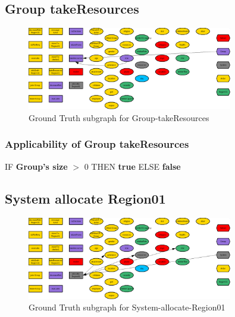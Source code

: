 \documentclass{article}%
\begin{document}
%
\subsection{Group takeResources}%
\label{subsec:Group takeResources}%


\begin{figure}[ht]%
\centering%
\includegraphics[width=0.8\textwidth]{images/Group-takeResources.png}%
\caption{Ground Truth subgraph for Group{-}takeResources}%
\end{figure}

%
\subsubsection{Applicability of Group takeResources}%
\label{ssubsec:Applicability of Group takeResources}%
\begin{flushleft}%
IF %
\textbf{Group's size}%
$>$%
0%
\linebreak%
\hspace*{2em}%
THEN %
\textbf{true}%
\linebreak%
\hspace*{2em}%
ELSE %
\textbf{false}%
\end{flushleft}

%
\subsection{System allocate Region01}%
\label{subsec:System allocate Region01}%


\begin{figure}[ht]%
\centering%
\includegraphics[width=0.8\textwidth]{images/System-allocate-Region01.png}%
\caption{Ground Truth subgraph for System{-}allocate{-}Region01}%
\end{figure}
\end{document}
